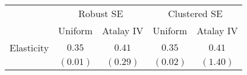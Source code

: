 
\begin{tabular}{l c c c c}
\hline
 & \multicolumn{2}{c}{Robust SE} & \multicolumn{2}{c}{Clustered SE} \\
\cline{2-3} \cline{4-5}
 & Uniform & Atalay IV & Uniform & Atalay IV \\
\hline
Elasticity & $0.35$   & $0.41$   & $0.35$   & $0.41$   \\
           & $(0.01)$ & $(0.29)$ & $(0.02)$ & $(1.40)$ \\
\hline
\end{tabular}
